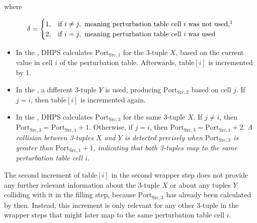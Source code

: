 \documentclass[twocolumn]{report}
\begin{document}
where
\vspace{-1cm}
\begin{center}
	\begin{adjustbox}{max width=\columnwidth}
		\begin{minipage}[t]{0.4\textwidth}
			\[
				\delta =
				\begin{cases}
					1, & \text{if } i \neq j,\ \text{meaning perturbation table cell } i \text{ was not used,}\footnote{Used or not used in the filling step.} \\
					2, & \text{if } i = j,\ \text{meaning perturbation table cell } i \text{ was used}
				\end{cases}
			\]
		\end{minipage}
	\end{adjustbox}
\end{center}
\begin{itemize}
	\item In the , DHPS calculates \(\text{Port}_{\text{Src},1}\) for the 3-tuple \( X \), based on the current value in cell \( i \) of the perturbation table. Afterwards, \(\text{table}[i]\) is incremented by 1.
	\item In the , a different 3-tuple \( Y \) is used, producing \(\text{Port}_{\text{Src},2}\) based on cell \( j \). If \( j = i \), then \(\text{table}[i]\) is incremented again.
	\item In the , DHPS calculates \(\text{Port}_{\text{Src},3}\) for the same 3-tuple \( X \). If \( j \neq i \), then \(\text{Port}_{\text{Src},3} = \text{Port}_{\text{Src},1} + 1\). Otherwise, if \( j = i \), then \(\text{Port}_{\text{Src},3} = \text{Port}_{\text{Src},1} + 2\). \textit{A collision between 3-tuples \( X \) and \( Y \) is detected precisely when \(\text{Port}_{\text{Src},3}\) is greater than \(\text{Port}_{\text{Src},1} + 1\), indicating that both 3-tuples map to the same perturbation table cell \( i \)}.
\end{itemize}

The second increment of \(\text{table}[i]\) in the second wrapper step does \alert{not provide any further relevant information} about the 3-tuple \( X \) or about any tuples \( Y \) colliding with it in the filling step, because \(\text{Port}_{\text{Src},3}\) has already been calculated by then. Instead, this increment is only relevant for any other 3-tuple in the wrapper steps that might later map to the same perturbation table cell \( i \).
\end{document}
